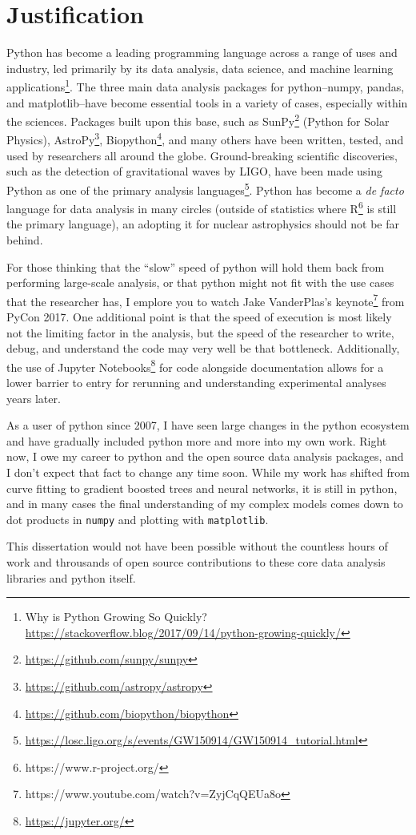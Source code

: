 \section{Justification}

Python has become a leading programming language across a range of uses
and industry, led primarily by its data analysis, data science, and
machine learning applications\footnote{Why is Python Growing So Quickly?
\url{https://stackoverflow.blog/2017/09/14/python-growing-quickly/}}.
The three main data analysis packages for python\---{}numpy, pandas, and
matplotlib\---{}have become essential tools in a variety of cases,
especially within the sciences. Packages built upon this base, such as
SunPy\footnote{\url{https://github.com/sunpy/sunpy}} (Python for Solar
Physics), AstroPy\footnote{\url{https://github.com/astropy/astropy}},
Biopython\footnote{\url{https://github.com/biopython/biopython}}, and
many others have been written, tested, and used by researchers all
around the globe. Ground-breaking scientific discoveries, such as the
detection of gravitational waves by LIGO, have been made using Python
as one of the primary analysis
languages\footnote{\url{https://losc.ligo.org/s/events/GW150914/GW150914_tutorial.html}}.
Python has become a \emph{de facto} language for data analysis in many
circles (outside of statistics where
R\footnote{https://www.r-project.org/} is still the primary language),
an adopting it for nuclear astrophysics should not be far behind.

For those thinking that the ``slow'' speed of python will hold them back
from performing large-scale analysis, or that python might not fit with
the use cases that the researcher has, I emplore you to watch Jake
VanderPlas's
keynote\footnote{https://www.youtube.com/watch?v=ZyjCqQEUa8o} from PyCon
2017. One additional point is that the speed of execution is most likely
not the limiting factor in the analysis, but the speed of the researcher
to write, debug, and understand the code may very well be that
bottleneck. Additionally, the use of Jupyter
Notebooks\footnote{\url{https://jupyter.org/}} for code alongside
documentation allows for a lower barrier to entry for rerunning and
understanding experimental analyses years later.

As a user of python since 2007, I have seen large changes in the python
ecosystem and have gradually included python more and more into my own
work. Right now, I owe my career to python and the open source data
analysis packages, and I don't expect that fact to change any time soon.
While my work has shifted from curve fitting to gradient boosted trees
and neural networks, it is still in python, and in many cases the final
understanding of my complex models comes down to dot products in
\verb+numpy+ and plotting with \verb+matplotlib+.

This dissertation would not have been possible without the countless
hours of work and throusands of open source contributions to these core
data analysis libraries and python itself.

